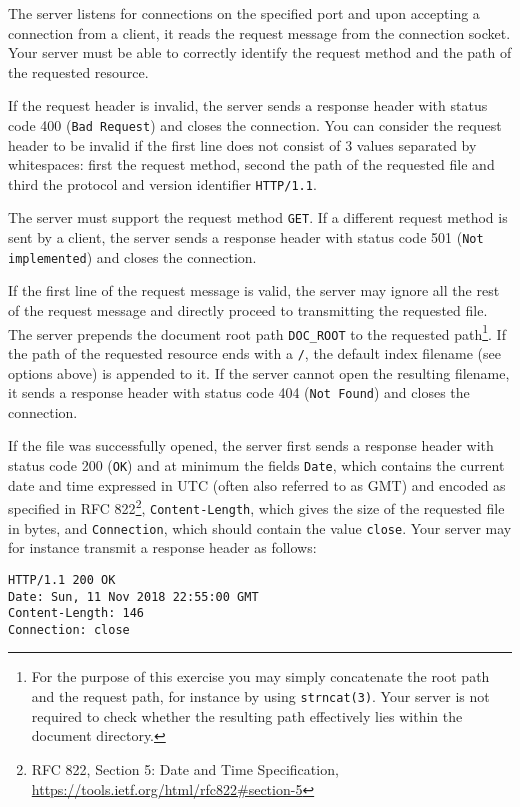 The server listens for connections on the specified port
and upon accepting a connection from a client,
it reads the request message from the connection socket.
Your server must be able to correctly identify the request method
and the path of the requested resource.

If the request header is invalid,
the server sends a response header with status code 400 (\verb|Bad Request|)
and closes the connection.
You can consider the request header to be invalid
if the first line does not consist of 3 values separated by whitespaces:
first the request method, second the path of the requested file
and third the protocol and version identifier \verb|HTTP/1.1|.

The server must support the request method \texttt{GET}.
If a different request method is sent by a client,
the server sends a response header with status code 501 (\verb|Not implemented|)
and closes the connection.

If the first line of the request message is valid,
the server may ignore all the rest of the request message
and directly proceed to transmitting the requested file.
The server prepends the document root path \verb|DOC_ROOT|
to the requested path\footnote{
For the purpose of this exercise you may simply concatenate the
root path and the request path, for instance by using \texttt{strncat(3)}.
Your server is not required to check whether the resulting path
effectively lies within the document directory.
}.
If the path of the requested resource ends with a \verb|/|,
the default index filename (see options above) is appended to it.
If the server cannot open the resulting filename,
it sends a response header with status code 404 (\verb|Not Found|)
and closes the connection.

If the file was successfully opened,
the server first sends a response header with status code 200 (\verb|OK|)
and at minimum the fields
\verb|Date|, which contains the current date and time
expressed in UTC (often also referred to as GMT)
and encoded as specified in RFC 822\footnote{RFC 822,
Section 5: Date and Time Specification,
\url{https://tools.ietf.org/html/rfc822\#section-5}},
\verb|Content-Length|, which gives the size of the requested file in bytes,
and \verb|Connection|, which should contain the value \verb|close|.
Your server may for instance transmit a response header as follows:

\begin{verbatim}
HTTP/1.1 200 OK
Date: Sun, 11 Nov 2018 22:55:00 GMT
Content-Length: 146
Connection: close
\end{verbatim}

